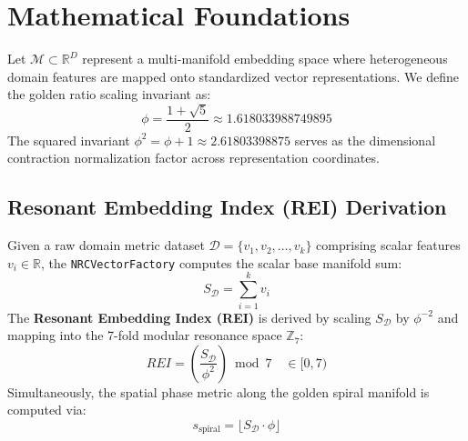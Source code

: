\section{Mathematical Foundations}
Let $\mathcal{M} \subset \mathbb{R}^D$ represent a multi-manifold embedding space where heterogeneous domain features are mapped onto standardized vector representations. We define the golden ratio scaling invariant as:
\begin{equation}
    \phi = \frac{1 + \sqrt{5}}{2} \approx 1.618033988749895
\end{equation}
The squared invariant $\phi^2 = \phi + 1 \approx 2.61803398875$ serves as the dimensional contraction normalization factor across representation coordinates.

\subsection{Resonant Embedding Index (REI) Derivation}
Given a raw domain metric dataset $\mathcal{D} = \{v_1, v_2, \dots, v_k\}$ comprising scalar features $v_i \in \mathbb{R}$, the \texttt{NRCVectorFactory} computes the scalar base manifold sum:
\begin{equation}
    S_{\mathcal{D}} = \sum_{i=1}^k v_i
\end{equation}
The \textbf{Resonant Embedding Index (REI)} is derived by scaling $S_{\mathcal{D}}$ by $\phi^{-2}$ and mapping into the 7-fold modular resonance space $\mathbb{Z}_7$:
\begin{equation}
    REI = \left( \frac{S_{\mathcal{D}}}{\phi^2} \right) \bmod 7 \quad \in [0, 7)
\end{equation}
Simultaneously, the spatial phase metric along the golden spiral manifold is computed via:
\begin{equation}
    s_{\text{spiral}} = \lfloor S_{\mathcal{D}} \cdot \phi \rfloor
\end{equation}

